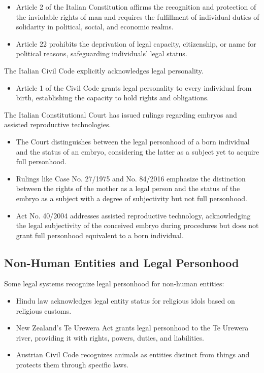 \begin{itemize}[label=-]
    \item Article 2 of the Italian Constitution affirms the recognition and protection of the inviolable rights of man and requires the fulfillment of individual duties of solidarity in political, social, and economic realms.
    \item Article 22 prohibits the deprivation of legal capacity, citizenship, or name for political reasons, safeguarding individuals' legal status.
\end{itemize}
The Italian Civil Code explicitly acknowledges legal personality.

\begin{itemize}[label=-]
    \item Article 1 of the Civil Code grants legal personality to every individual from birth, establishing the capacity to hold rights and obligations.
\end{itemize}
The Italian Constitutional Court has issued rulings regarding embryos and assisted reproductive technologies.

\begin{itemize}[label=-]
    \item The Court distinguishes between the legal personhood of a born individual and the status of an embryo, considering the latter as a subject yet to acquire full personhood.
    \item Rulings like Case No. 27/1975 and No. 84/2016 emphasize the distinction between the rights of the mother as a legal person and the status of the embryo as a subject with a degree of subjectivity but not full personhood.
    \item Act No. 40/2004 addresses assisted reproductive technology, acknowledging the legal subjectivity of the conceived embryo during procedures but does not grant full personhood equivalent to a born individual.
\end{itemize}

\subsection{Non-Human Entities and Legal Personhood}
Some legal systems recognize legal personhood for non-human entities:

\begin{itemize}[label=-]
    \item Hindu law acknowledges legal entity status for religious idols based on religious customs.
    \item New Zealand's Te Urewera Act grants legal personhood to the Te Urewera river, providing it with rights, powers, duties, and liabilities.
    \item Austrian Civil Code recognizes animals as entities distinct from things and protects them through specific laws.
\end{itemize}

